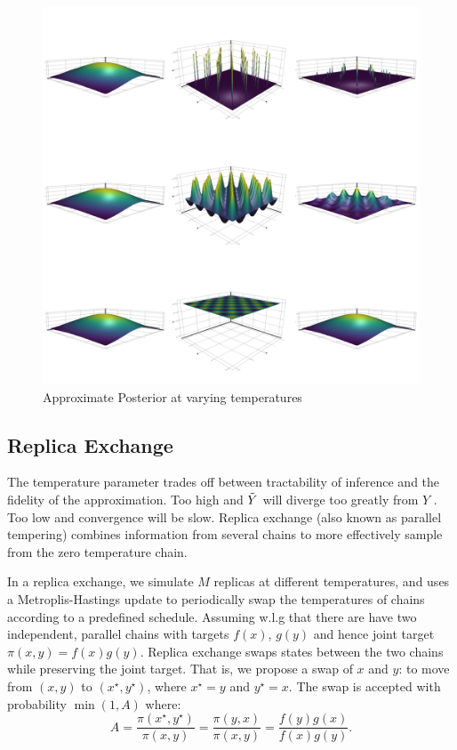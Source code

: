 \begin{figure}\label{temppost}
\includegraphics[width=\linewidth]{approxpost.png}
\caption{Approximate Posterior at varying temperatures}
\end{figure}



\subsection{Replica Exchange}\label{replicaexchange}

The temperature parameter trades off between tractability of inference and the fidelity of the approximation.
Too high and $\mathrel{\tilde{Y}}$ will diverge too greatly from $Y$   . Too low and convergence will be slow.
Replica exchange (also known as parallel tempering) \citep{swendsen1986replica} combines information from several chains to more  effectively sample from the zero temperature chain.

In a replica exchange, we simulate $M$ replicas at different temperatures, and uses a Metroplis-Hastings update to  periodically swap the temperatures of chains according to a predefined schedule.
Assuming w.l.g that there are have two independent, parallel chains with targets $f(x)$, $g(y)$ and hence joint target $\pi(x,y)=f(x)g(y)$.
Replica exchange swaps states between the two chains while preserving the joint target.
That is, we propose a swap of $x$ and $y$: to move from $(x, y)$ to $(x^\star,y^\star)$, where $x^\star=y$ and $y^\star=x$.
The swap is accepted with probability $\min(1, A)$ where:
\begin{equation}
A = \frac{\pi(x^\star,y^\star)}{\pi(x,y)} = \frac{\pi(y,x)}{\pi(x,y)} = \frac{f(y)g(x)}{f(x)g(y)}.
\end{equation}

